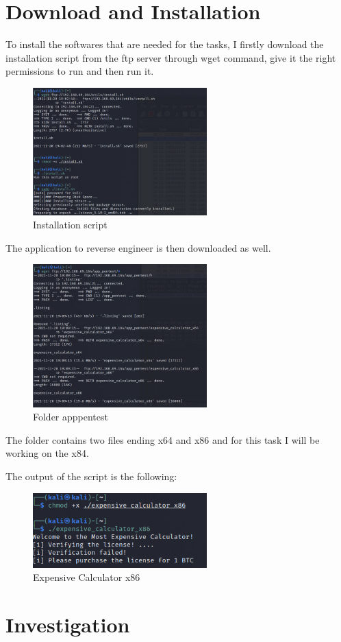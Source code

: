 \section{Download and Installation}
\label{sec:download-and-installation}
To install the softwares that are needed for the tasks, I firstly download the
installation script from the ftp server through wget command, give it the right
permissions to run and then run it.

\begin{figure}[H]
  \centering
  \includegraphics[width=0.6\textwidth]{figures/install-sh}
  \caption{Installation script}
  \label{f:install-sh}
\end{figure}

The application to reverse engineer is then downloaded as well.

\begin{figure}[H]
  \centering
  \includegraphics[width=0.6\textwidth]{figures/app_pentest}
  \caption{Folder apppentest}
  \label{f:app_pentest}
\end{figure}

The folder contains two files ending x64 and x86 and for this task I will be
working on the x84.

The output of the script is the following:

\begin{figure}[H]
  \centering
  \includegraphics[width=0.6\textwidth]{figures/expensive_calculator_run}
  \caption{Expensive Calculator x86}
  \label{f:expensive_calculator_run}
\end{figure}

\section{Investigation}
\label{sec:investigation}


